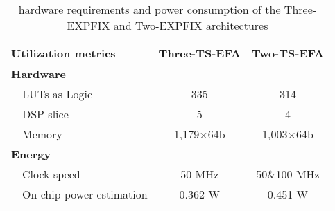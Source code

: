 \begin{table}[!b]\centering
\caption{\label{tab:tab3} hardware requirements and power consumption of the Three-EXP\textunderscore FIX and Two-EXP\textunderscore FIX architectures}
\renewcommand{\arraystretch}{1.15} 
\begin{threeparttable}\small
\begin{tabular}[ht]{lcc}\toprule \toprule
    \textbf{Utilization metrics} &\textbf{Three-TS-EFA} &\textbf{Two-TS-EFA}\\\midrule
    \textbf{Hardware} & &\\
    ~~LUTs as Logic &335 &314\\
    ~~DSP slice &5 &4\\
    ~~Memory &1,179$\times$64b &1,003$\times$64b \\
    \textbf{Energy} & &\\
    ~~Clock speed &50 MHz& 50\&100 MHz  \\
    ~~On-chip power estimation &0.362 W &0.451 W \\
\bottomrule \bottomrule
\end{tabular}
\end{threeparttable}
\end{table}
